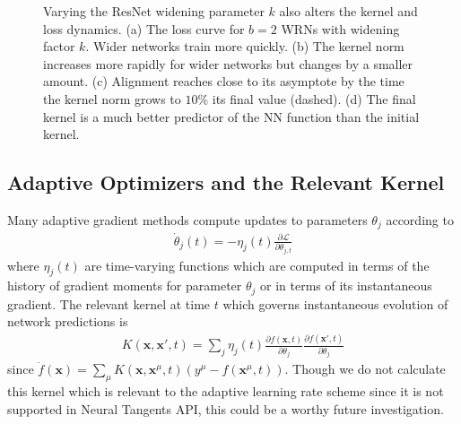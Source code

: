 \documentclass{article} %
\def\x{\bm x}
\begin{document}
\begin{figure}
    \centering
    \caption{Varying the ResNet widening parameter $k$ also alters the kernel and loss dynamics. (a)  The loss curve for $b=2$ WRNs with widening factor $k$. Wider networks train more quickly. (b) The kernel norm increases more rapidly for wider networks but changes by a smaller amount. (c) Alignment reaches close to its asymptote by the time the kernel norm grows to $10\%$ its final value (dashed). (d) The final kernel is a much better predictor of the NN function than the initial kernel. }
    \label{fig:my_label}
\end{figure}


\subsection{Adaptive Optimizers and the Relevant Kernel}
Many adaptive gradient methods compute updates to parameters $\theta_j$ according to
\begin{align}
    \dot{\theta}_{j}(t) =  - \eta_{j}(t) \frac{\partial \mathcal L}{\partial \theta_{j,t}} 
\end{align}
where $\eta_{j}(t)$ are time-varying functions which are computed in terms of the history of gradient moments for parameter $\theta_j$ or in terms of its instantaneous gradient. The relevant kernel at time $t$ which governs instantaneous evolution of network predictions is
\begin{align}
    K(\x,\x', t) = \sum_j \eta_j(t) \frac{\partial f(\x, t)}{\partial \theta_j} \frac{\partial f(\x',t)}{\partial \theta_j} 
\end{align}
since $\dot{f}(\x) =\sum_\mu K(\x,\x^\mu,t) (y^\mu - f(\x^\mu, t))$. Though we do not calculate this kernel which is relevant to the adaptive learning rate scheme since it is not supported in Neural Tangents API, this could be a worthy future investigation. 
\end{document}
